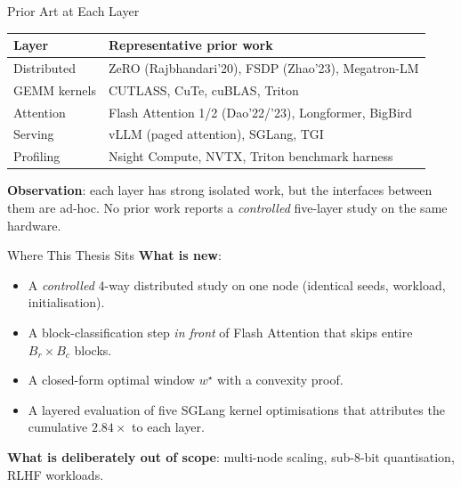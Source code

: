 \documentclass[10pt,aspectratio=169]{beamer}
\begin{document}
\begin{frame}{Prior Art at Each Layer}
  \small
  \begin{tabular}{ll}
    \toprule
    \textbf{Layer} & \textbf{Representative prior work} \\
    \midrule
    Distributed   & ZeRO (Rajbhandari'20), FSDP (Zhao'23), Megatron-LM \\
    GEMM kernels  & CUTLASS, CuTe, cuBLAS, Triton \\
    Attention     & Flash Attention 1/2 (Dao'22/'23), Longformer, BigBird \\
    Serving       & vLLM (paged attention), SGLang, TGI \\
    Profiling     & Nsight Compute, NVTX, Triton benchmark harness \\
    \bottomrule
  \end{tabular}
  \vspace{2ex}

  \textbf{Observation}: each layer has strong isolated work, but the
  interfaces between them are ad-hoc. No prior work reports a
  \emph{controlled} five-layer study on the same hardware.
\end{frame}

\begin{frame}{Where This Thesis Sits}
  \textbf{What is new}:
  \begin{itemize}
    \item A \emph{controlled} 4-way distributed study on one node
          (identical seeds, workload, initialisation).
    \item A block-classification step \emph{in front} of Flash
          Attention that skips entire $B_r{\times}B_c$ blocks.
    \item A closed-form optimal window $w^\star$ with a convexity
          proof.
    \item A layered evaluation of five SGLang kernel optimisations
          that attributes the cumulative $2.84\times$ to each layer.
  \end{itemize}
  \vspace{2ex}

  \textbf{What is deliberately out of scope}:
  multi-node scaling, sub-8-bit quantisation, RLHF workloads.
\end{frame}

\end{document}
